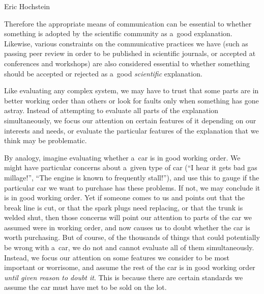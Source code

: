 \begin{artengenv}{Eric Hochstein}

Therefore the appropriate means of communication can be essential to whether something is adopted by the scientific community as a~good explanation. Likewise, various constraints on the communicative practices we have (such as passing peer review in order to be published in scientific journals, or accepted at conferences and workshops) are also considered essential to whether something should be accepted or rejected as a~good \textit{scientific} explanation.

Like evaluating any complex system, we may have to trust that some parts are in better working order than others or look for faults only when something has gone astray. Instead of attempting to evaluate all parts of the explanation simultaneously, we focus our attention on certain features of it depending on our interests and needs, or evaluate the particular features of the explanation that we think may be problematic.

By analogy, imagine evaluating whether a~car is in good working order. We might have particular concerns about a~given type of car (``I hear it gets bad gas millage!'', ``The engine is known to frequently stall!''), and use this to gauge if the particular car we want to purchase has these problems. If not, we may conclude it is in good working order. Yet if someone comes to us and points out that the break line is cut, or that the spark plugs need replacing, or that the trunk is welded shut, then those concerns will point our attention to parts of the car we assumed were in working order, and now causes us to doubt whether the car is worth purchasing. But of course, of the thousands of things that could potentially be wrong with a~car, we do not and cannot evaluate all of them simultaneously. Instead, we focus our attention on some features we consider to be most important or worrisome, and assume the rest of the car is in good working order \textit{until given reason to doubt it}. This is because there are certain standards we assume the car must have met to be sold on the lot.


\end{artengenv}
